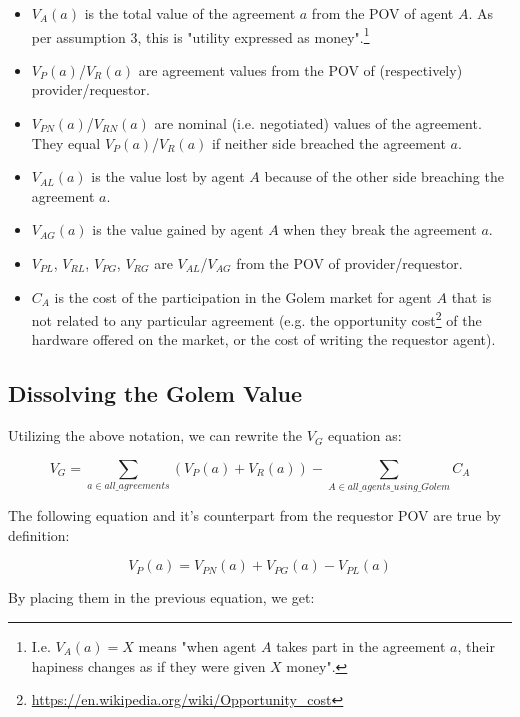 \documentclass{article}
\begin{document}
\begin{itemize}
\item $V_A(a)$ is the total value of the agreement $a$ from the POV of agent $A$. As per assumption 3, this is "utility expressed as money".\footnote{
I.e. $V_A(a) = X$ means "when agent $A$ takes part in the agreement $a$, their hapiness changes as if they were given $X$ money".}
\item $V_P(a)$/$V_R(a)$ are agreement values from the POV of (respectively) provider/requestor.
\item $V_{PN}(a)$/$V_{RN}(a)$ are nominal (i.e. negotiated) values of the agreement. They equal $V_P(a)$/$V_R(a)$ if neither side breached the agreement $a$.
\item $V_{AL}(a)$ is the value lost by agent $A$ because of the other side breaching the agreement $a$.
\item $V_{AG}(a)$ is the value gained by agent $A$ when they break the agreement $a$.
\item $V_{PL}$, $V_{RL}$, $V_{PG}$, $V_{RG}$ are $V_{AL}$/$V_{AG}$ from the POV of provider/requestor.
\item $C_A$ is the cost of the participation in the Golem market for agent $A$ that is not related to any particular agreement 
(e.g. the opportunity cost\footnote{\href{https://en.wikipedia.org/wiki/Opportunity\_cost}{https://en.wikipedia.org/wiki/Opportunity\_cost}} of the hardware offered on the market, 
or the cost of writing the requestor agent).
\end{itemize}

\subsection{Dissolving the Golem Value}

Utilizing the above notation, we can rewrite the $V_G$ equation as:

\begin{equation}
    V_G = \sum_{a \in all\_agreements}(V_P(a) + V_R(a)) - \sum_{A \in all\_agents\_using\_Golem}C_A
\end{equation}

The following equation and it's counterpart from the requestor POV are true by definition:

\begin{equation}
    V_P(a) = V_{PN}(a) + V_{PG}(a) - V_{PL}(a)
\end{equation}

By placing them in the previous equation, we get:
\end{document}

